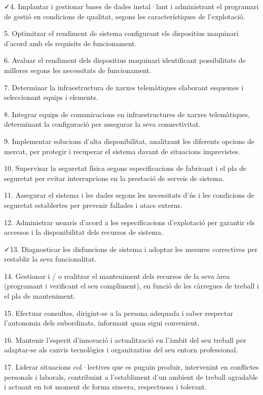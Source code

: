 \documentclass[catalan, a4paper, 12pt, titlepage]{article}
\begin{document}
\faCheck 4. Implantar i gestionar bases de dades instal·lant i administrant el programari de gestió en condicions de qualitat, segons les característiques de l'explotació.

5. Optimitzar el rendiment de sistema configurant els dispositius maquinari d'acord amb els requisits de funcionament.

6. Avaluar el rendiment dels dispositius maquinari identificant possibilitats de millores segons les necessitats de funcionament.

7. Determinar la infraestructura de xarxes telemàtiques elaborant esquemes i seleccionant equips i elements.

8. Integrar equips de comunicacions en infraestructures de xarxes telemàtiques, determinant la configuració per assegurar la seva connectivitat.

9. Implementar solucions d'alta disponibilitat, analitzant les diferents opcions de mercat, per protegir i recuperar el sistema davant de situacions imprevistes.

10. Supervisar la seguretat física segons especificacions de fabricant i el pla de seguretat per evitar interrupcions en la prestació de serveis de sistema.

11. Assegurar el sistema i les dades segons les necessitats d'ús i les condicions de seguretat establertes per prevenir fallades i atacs externs.

12. Administrar usuaris d'acord a les especificacions d'explotació per garantir els accessos i la disponibilitat dels recursos de sistema.

\faCheck 13. Diagnosticar les disfuncions de sistema i adoptar les mesures correctives per restablir la seva funcionalitat.

14. Gestionar i / o realitzar el manteniment dels recursos de la seva àrea (programant i verificant el seu compliment), en funció de les càrregues de treball i el pla de manteniment.

15. Efectuar consultes, dirigint-se a la persona adequada i saber respectar l'autonomia dels subordinats, informant quan sigui convenient.

16. Mantenir l'esperit d'innovació i actualització en l'àmbit del seu treball per adaptar-se als canvis tecnològics i organitzatius del seu entorn professional.

17. Liderar situacions col·lectives que es puguin produir, intervenint en conflictes personals i laborals, contribuint a l'establiment d'un ambient de treball agradable i actuant en tot moment de forma sincera, respectuosa i tolerant.
\end{document}
